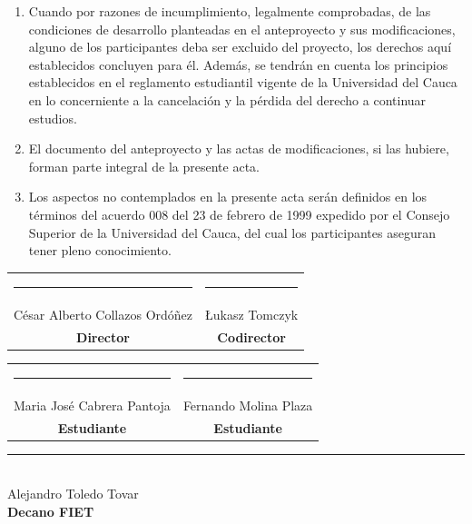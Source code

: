 \begin{enumerate}
    \item Cuando por razones de incumplimiento, legalmente comprobadas, de las condiciones de desarrollo planteadas en el anteproyecto y sus modificaciones, alguno de los participantes deba ser excluido del proyecto, los derechos aquí establecidos concluyen para él. Además, se tendrán en cuenta los principios establecidos en el reglamento estudiantil vigente de la Universidad del Cauca en lo concerniente a la cancelación y la pérdida del derecho a continuar estudios. \\
    \item El documento del anteproyecto y las actas de modificaciones, si las hubiere, forman parte integral de la presente acta. \\
    \item Los aspectos no contemplados en la presente acta serán definidos en los términos del acuerdo 008 del 23 de febrero de 1999 expedido por el Consejo Superior de la Universidad del Cauca, del cual los participantes aseguran tener pleno conocimiento. \\
\end{enumerate}
    
\vspace{1.5cm}

\begin{center}
    \begin{tabular}{c c}
        \rule{6.5cm}{0.4pt} & \rule{6.5cm}{0.4pt} \\
        César Alberto Collazos Ordóñez & Łukasz Tomczyk \\
        \textbf{Director} & \textbf{Codirector} \\
    \end{tabular}
\end{center}

\vspace{1cm}

\begin{center}
    \begin{tabular}{c c}
        \rule{6.5cm}{0.4pt} & \rule{6.5cm}{0.4pt} \\
        Maria José Cabrera Pantoja & Fernando Molina Plaza \\
        \textbf{Estudiante} & \textbf{Estudiante} \\
    \end{tabular}
\end{center}

\vspace{1cm}

\begin{center}
    \rule{6.5cm}{0.4pt} \\
    Alejandro Toledo Tovar \\
    \textbf{Decano FIET}
\end{center}



